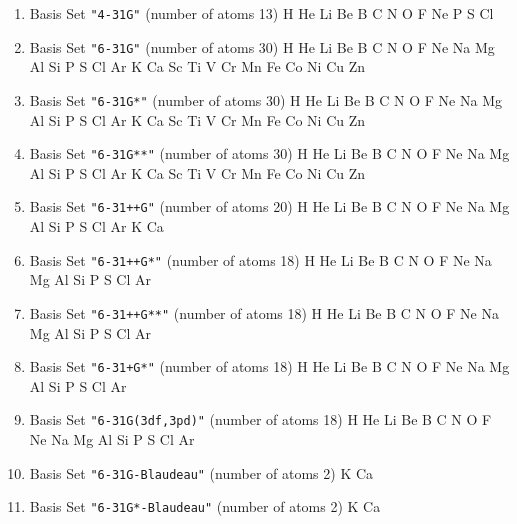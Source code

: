 \begin{enumerate}
\item Basis Set \verb#"4-31G"# (number of atoms 13)  \newline
  H He Li Be B C N O F Ne P S Cl


\item Basis Set \verb#"6-31G"# (number of atoms 30)  \newline
  H He Li Be B C N O F Ne Na Mg Al Si P S Cl Ar K Ca Sc Ti V Cr Mn
 Fe Co Ni Cu Zn


\item Basis Set \verb#"6-31G*"# (number of atoms 30)  \newline
  H He Li Be B C N O F Ne Na Mg Al Si P S Cl Ar K Ca Sc Ti V Cr Mn
 Fe Co Ni Cu Zn


\item Basis Set \verb#"6-31G**"# (number of atoms 30)  \newline
  H He Li Be B C N O F Ne Na Mg Al Si P S Cl Ar K Ca Sc Ti V Cr Mn
 Fe Co Ni Cu Zn


\item Basis Set \verb#"6-31++G"# (number of atoms 20)  \newline
  H He Li Be B C N O F Ne Na Mg Al Si P S Cl Ar K Ca


\item Basis Set \verb#"6-31++G*"# (number of atoms 18)  \newline
  H He Li Be B C N O F Ne Na Mg Al Si P S Cl Ar


\item Basis Set \verb#"6-31++G**"# (number of atoms 18)  \newline
  H He Li Be B C N O F Ne Na Mg Al Si P S Cl Ar


\item Basis Set \verb#"6-31+G*"# (number of atoms 18)  \newline
  H He Li Be B C N O F Ne Na Mg Al Si P S Cl Ar


\item Basis Set \verb#"6-31G(3df,3pd)"# (number of atoms 18)  \newline
  H He Li Be B C N O F Ne Na Mg Al Si P S Cl Ar


\item Basis Set \verb#"6-31G-Blaudeau"# (number of atoms 2)  \newline
  K Ca

\item Basis Set \verb#"6-31G*-Blaudeau"# (number of atoms 2)  \newline
  K Ca



\end{enumerate}
